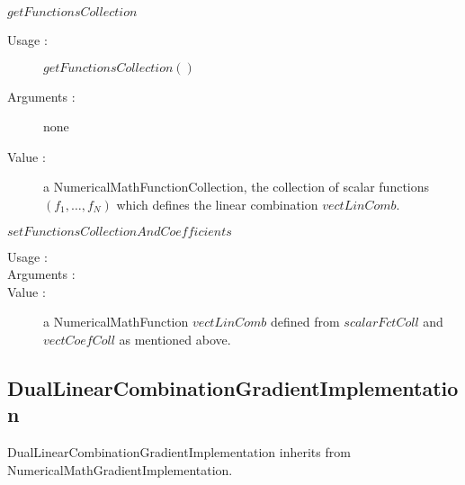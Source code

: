 \begin{description}
\begin{description}
  \item $getFunctionsCollection$
    \begin{description}
    \item[Usage :] $getFunctionsCollection()$
    \item[Arguments :] none
    \item[Value :] a NumericalMathFunctionCollection, the collection of scalar functions $(f_1, \hdots, f_N)$  which defines the linear combination $vectLinComb$.
    \end{description}
    \bigskip

  \item $setFunctionsCollectionAndCoefficients$
    \begin{description}
    \item[Usage :] \rule{0pt}{1em}
    \item[Arguments :] \rule{0pt}{1em}
    \item[Value :] a  NumericalMathFunction $vectLinComb$ defined from $scalarFctColl$ and $vectCoefColl$ as mentioned above.
    \end{description}

  \end{description}

\end{description}


\newpage
\subsection{DualLinearCombinationGradientImplementation}


DualLinearCombinationGradientImplementation inherits from NumericalMathGradientImplementation.

